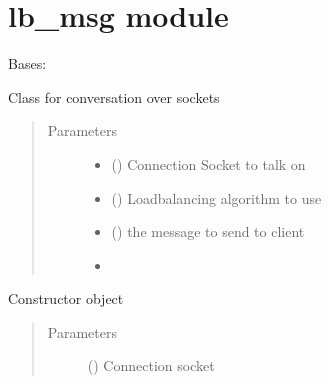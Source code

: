 \documentclass[letterpaper,10pt,english]{sphinxmanual}
\begin{document}
\section{lb\_msg module}
\label{\detokenize{lb_msg:module-lb_msg}}\label{\detokenize{lb_msg:lb-msg-module}}\label{\detokenize{lb_msg::doc}}

\begin{fulllineitems}
\label{\detokenize{lb_msg:lb_msg.LoadBalancerMessage}}
Bases: 

Class for conversation over sockets
\begin{quote}\begin{description}
\item[{Parameters}] \leavevmode\begin{itemize}
\item {} 
 () \textendash{} Connection Socket to talk on

\item {} 
 () \textendash{} Loadbalancing algorithm to use

\item {} 
 () \textendash{} the message to send to client

\item {} 
 \textendash{} 

\end{itemize}

\end{description}\end{quote}

Constructor object
\begin{quote}\begin{description}
\item[{Parameters}] \leavevmode
{} () \textendash{} Connection socket


\end{description}
\end{quote}
\end{fulllineitems}
\end{document}
